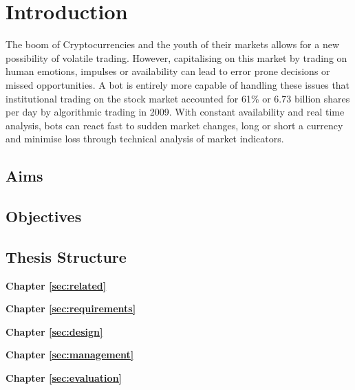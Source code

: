 
\chapter{Introduction}
\label{sec:intro}


The boom of Cryptocurrencies and the youth of their markets allows for a new possibility of volatile trading. However, capitalising on this market by trading on human emotions, impulses or availability can lead to error prone decisions or missed opportunities. A bot is entirely more capable of handling these issues that institutional trading on the stock market accounted for 61\% or 6.73 billion shares\cite{WEB:Cheng:2017} per day by algorithmic trading in 2009. With constant availability and real time analysis, bots can react fast to sudden market changes, long or short a currency and minimise loss through technical analysis of market indicators.




\section{Aims}
\label{sec:intro:aims}



\section{Objectives}
\label{sec:intro:objectives}




\section{Thesis Structure}
\label{sec:intro:structure}

\textbf{Chapter \ref{sec:related}} \\[0.2em]
\blindtext

\textbf{Chapter \ref{sec:requirements}} \\[0.2em]
\blindtext

\textbf{Chapter \ref{sec:design}} \\[0.2em]
\blindtext

\textbf{Chapter \ref{sec:management}} \\[0.2em]
\blindtext

\textbf{Chapter \ref{sec:evaluation}} \\[0.2em]
\blindtext
